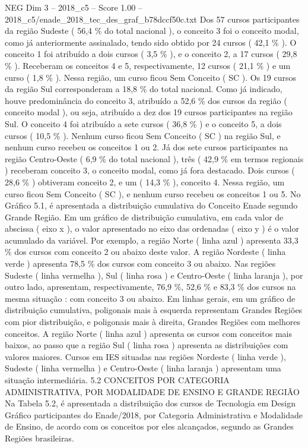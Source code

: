 \begin{textsample}{NEG Dim 3 – 2018\_c5 – Score 1.00 – 2018\_c5/enade\_2018\_tec\_des\_graf\_b78dccf50c.txt}
Dos 57 cursos participantes da região Sudeste ( 56,4 \% do total nacional ), o conceito 3 foi o conceito modal, como já anteriormente assinalado, tendo sido obtido por 24 cursos ( 42,1 \% ).
O conceito 1 foi atribuído a dois cursos ( 3,5 \% ), e o conceito 2, a 17 cursos ( 29,8 \% ).
Receberam os conceitos 4 e 5, respectivamente, 12 cursos ( 21,1 \% ) e um curso ( 1,8 \% ).
Nessa região, um curso ficou Sem Conceito ( SC ).
Os 19 cursos da região Sul corresponderam a 18,8 \% do total nacional.
Como já indicado, houve predominância do conceito 3, atribuído a 52,6 \% dos cursos da região ( conceito modal ), ou seja, atribuído a dez dos 19 cursos participantes na região Sul.
O conceito 4 foi atribuído a sete cursos ( 36,8 \% ) e o conceito 5, a dois cursos ( 10,5 \% ).
Nenhum curso ficou Sem Conceito ( SC ) na região Sul, e nenhum curso recebeu os conceitos 1 ou 2.
Já dos sete cursos participantes na região Centro-Oeste ( 6,9 \% do total nacional ), três ( 42,9 \% em termos regionais ) receberam conceito 3, o conceito modal, como já fora destacado.
Dois cursos ( 28,6 \% ) obtiveram conceito 2, e um ( 14,3 \% ), conceito 4.
Nessa região, um curso ficou Sem Conceito ( SC ), e nenhum curso recebeu os conceitos 1 ou 5.
No Gráfico 5.1, é apresentada a distribuição cumulativa do Conceito Enade segundo Grande Região.
Em um gráfico de distribuição cumulativa, em cada valor de abscissa ( eixo x ), o valor apresentado no eixo das ordenadas ( eixo y ) é o valor acumulado da variável.
Por exemplo, a região Norte ( linha azul ) apresenta 33,3 \% dos cursos com conceito 2 ou abaixo deste valor.
A região Nordeste ( linha verde ) apresenta 78,5 \% dos cursos com conceito 3 ou abaixo.
Nas regiões Sudeste ( linha vermelha ), Sul ( linha rosa ) e Centro-Oeste ( linha laranja ), por outro lado, apresentam, respectivamente, 76,9 \%, 52,6 \% e 83,3 \% dos cursos na mesma situação : com conceito 3 ou abaixo.
Em linhas gerais, em um gráfico de distribuição cumulativa, poligonais mais à esquerda representam Grandes Regiões com pior distribuição, e poligonais mais à direita, Grandes Regiões com melhores conceitos.
A região Norte ( linha azul ) apresenta os cursos com conceitos mais baixos, ao passo que a região Sul ( linha rosa ) apresenta as distribuições com valores maiores.
Cursos em IES situadas nas regiões Nordeste ( linha verde ), Sudeste ( linha vermelha ) e Centro-Oeste ( linha laranja ) apresentam uma situação intermediária. 5.2 CONCEITOS POR CATEGORIA ADMINISTRATIVA, POR MODALIDADE DE ENSINO E GRANDE REGIÃO Na Tabela 5.2, é apresentada a distribuição dos cursos de Tecnologia em Design Gráfico participantes do Enade/2018, por Categoria Administrativa e Modalidade de Ensino, de acordo com os conceitos por eles alcançados, segundo as Grandes Regiões brasileiras.

\end{textsample}
